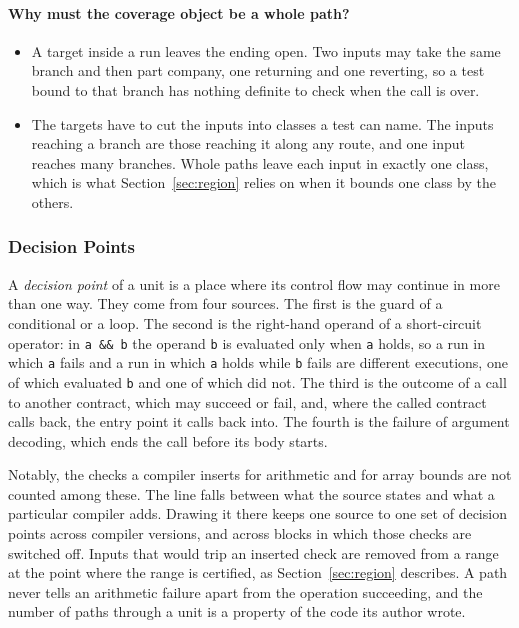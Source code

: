 \documentclass[manuscript,anonymous]{acmart}
\begin{document}
\paragraph{Why must the coverage object be a whole path?}
\begin{itemize}
\item A target inside a run leaves the ending open. Two inputs may take the same
branch and then part company, one returning and one reverting, so a test bound
to that branch has nothing definite to check when the call is over.
\item The targets have to cut the inputs into classes a test can name. The
inputs reaching a branch are those reaching it along any route, and one input
reaches many branches. Whole paths leave each input in exactly one class, which
is what Section~\ref{sec:region} relies on when it bounds one class by the
others.
\end{itemize}

\subsubsection{Decision Points}
A \emph{decision point} of a unit is a place where its control flow may continue
in more than one way. They come from four sources. The first is the
guard of a conditional or a loop. The second is the right-hand operand of a
short-circuit operator: in \texttt{a \&\& b} the operand \texttt{b} is evaluated
only when \texttt{a} holds, so a run in which \texttt{a} fails and a run in
which \texttt{a} holds while \texttt{b} fails are different executions, one of
which evaluated \texttt{b} and one of which did not. The third is the outcome of
a call to another contract, which may succeed or fail, and, where the called
contract calls back, the entry point it calls back into. The fourth is the
failure of argument decoding, which ends the call before its body starts.

Notably, the checks a compiler inserts for arithmetic and for array bounds are
not counted among these. The line falls between what the source states and what
a particular compiler adds. Drawing it there keeps one source to one set of
decision points across compiler versions, and across blocks in which those
checks are switched off. Inputs that would trip an inserted check are removed
from a range at the point where the range is certified, as
Section~\ref{sec:region} describes. A path never tells
an arithmetic failure apart from the operation succeeding, and the number of
paths through a unit is a property of the code its author wrote.
\end{document}

